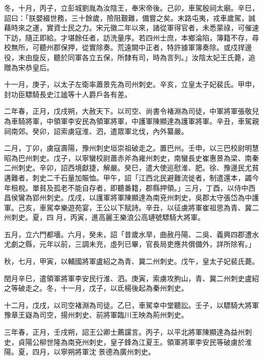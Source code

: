 \begin{pinyinscope}
 冬，十月，丙子，立彭城劉胤為汝陰王，奉宋帝後。己卯，車駕殷祠太廟。辛巳，詔曰：「朕嬰綴世務，三十餘歲，險阻艱難，備嘗之矣。末路屯夷，戎車歲駕，誠藉時來之運，實資士民之力。宋元徽二年以來，諸從軍得官者，未悉蒙祿，可催速下訪，隨正即給。才堪餘任者，訪洗量序。若四州士庶，本鄉淪陷，簿籍不存，尋校無所，可聽州郡保押，從實除奏。荒遠闕中正者，特許據軍簿奏除。或戍捍邊役，末由旋反，聽於同軍各立五保，所隸有司，時為言列。」汝陰太妃王氏薨，追贈為宋恭皇后。



 十一月，庚子，以太子左衛率蕭景先為司州刺史。辛亥，立皇太子妃裴氏。甲申，封功臣驃騎長史江謐等十人爵戶各有差。



 二年春，正月，戊戌朔，大赦天下。以司空、尚書令褚淵為司徒，中軍將軍張敬兒為車騎將軍，中領軍李安民為領軍將軍，中護軍陳顯達為護軍將軍。辛丑，車駕親祠南郊。癸卯，詔索虜寇淮、泗，遣眾軍北伐，內外纂嚴。



 二月，丁卯，虜寇壽陽，豫州刺史垣崇祖破走之。置巴州。壬申，以三巴校尉明慧昭為巴州刺史。戊子，以寧蠻校尉蕭赤斧為雍州刺史，南蠻長史崔惠景為梁、南秦二州刺史。辛卯，詔西境獻捷，解嚴。癸巳，遣大使巡慰淮、肥。徐、豫邊民尤貧遘難者，刺史二千石量加賑恤。甲午，詔「江西北民避難流徙者，制遣還本，蠲今年租稅。單貧及孤老不能自存者，即聽番籍，郡縣押領。」三月，丁酉，以侍中西昌侯鸞為郢州刺史。戊戌，以護軍將軍陳顯達為南兗州刺史，吳郡太守張岱為中護軍。己亥，車駕幸樂遊苑宴，王公以下賦詩。辛丑，以征虜將軍崔祖思為青、冀二州刺史。夏，四
 月，丙寅，進高麗王樂浪公高璉號驃騎大將軍。



 五月，立六門都墻。六月，癸未，詔「昔歲水旱，曲赦丹陽、二吳、義興四郡遭水尤劇之縣，元年以前，三調未充，虛列已畢，官長局吏應共償備外，詳所除宥。」



 秋，七月，甲寅，以輔國將軍盧紹之為青、冀二州刺史。戊午，皇太子妃裴氏薨。



 閏月辛巳，遣領軍將軍李安民行淮、泗。庚寅，索虜攻朐山，青、冀二州刺史盧紹之等破走之。冬，十一月，戊子，以氐楊後起為秦州刺史。



 十二月，戊戌，以司空褚淵為司徒。乙巳，車駕幸中堂聽訟。壬子，以驃騎大將軍豫章王嶷為司空，揚州刺史、前將軍臨川王映為荊州刺史。



 三年春，正月，壬戌朔，詔王公卿士薦讜言。丙子，以平北將軍陳顯達為益州刺史，貞陽公柳世隆為南兗州刺史，皇子鋒為江夏王。領軍將軍李安民等破虜於淮陽。夏，四月，以寧朔將軍沈
 景德為廣州刺史。




\end{pinyinscope}
